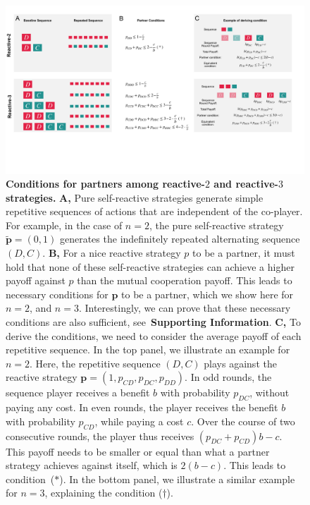 \documentclass[9pt,twocolumn,twoside]{pnas-new}
\def\SI{\textbf{Supporting Information}}
\begin{document}
\begin{figure}[tbhp]
       \centering
       \includegraphics[width=\textwidth]{../../figures/conceptual_figure_conditions.pdf}
       \caption{
       \textbf{Conditions for partners among reactive-$2$ and reactive-$3$ strategies.}
       {\bf A, } Pure self-reactive strategies generate simple repetitive sequences of actions that are independent of the co-player. 
       For example, in the case of \(n\!=\!2\), the pure self-reactive strategy \(\mathbf{\tilde{p}}=(0, 1)\) generates the indefinitely repeated alternating sequence \((D, C)\).
       {\bf B,} For a nice reactive strategy \(p\) to be a partner, it must hold that none of these
  self-reactive strategies can achieve a higher payoff against
       \(p\) than the mutual cooperation payoff. 
       This leads to necessary conditions for $\mathbf{p}$ to be a partner, which we show here for \(n\!=\!2\), and \(n\!=\!3\).       Interestingly, we can prove that these necessary conditions are also sufficient, see~\SI.
       {\bf C,} To derive the conditions, we need to consider the average payoff of each repetitive sequence. 
       In the top panel, we illustrate an example for \(n\!=\!2\). 
       Here, the repetitive sequence  \((D, C)\) plays against the reactive strategy \(\mathbf{p} = (1, p_{CD}, p_{DC},
       p_{DD})\). 
       In odd rounds, the sequence player receives a benefit \(b\) with probability \(p_{DC}\), without paying any cost. 
       In even rounds, the player receives the benefit \(b\) with probability $p_{CD}$, while paying a cost $c$. 
       Over the course of two consecutive rounds, the player thus receives $(p_{DC}\!+\!p_{CD})b\!-\!c$. 
       This payoff needs to be smaller or equal than what a partner strategy achieves against itself, which is \(2(b\!-\!c)\).
       This leads to condition~($\ast$). 
       In the bottom panel, we illustrate a similar example for $n\!=\!3$, explaining the condition ($\dagger$). 
       }\label{fig:conceptual_figure_conditions}
\end{figure}
\end{document}

